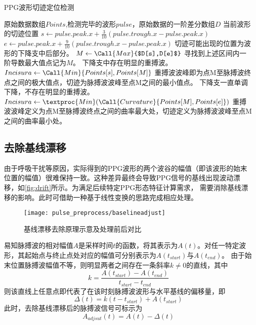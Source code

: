 \begin{breakablealgorithm}
    \caption{PPG波形切迹定位检测}
    \label{alg:incisuras_detect}
    \begin{algorithmic}[1] %
        \Require 原始数据数组$Points$,检测完毕的波形$pulse$，原始数据的一阶差分数组$D$
        \Ensure 当前波形的切迹位置
            \State $s \gets pulse.peak.x + \frac{3}{10}(pulse.trough.x-pulse.peak.x)$
            \State $e \gets pulse.peak.x + \frac{9}{10}(pulse.trough.x-pulse.peak.x)$
            \State \Comment 切迹可能出现的位置为波形的下降支中后部分。
            \State $M  \gets \Call{Max}{$D[s],D[e]$}$
            \State \Comment 寻找到上述区间内一阶导数最大值点记为$M$。
                \State \Comment 下降支中存在明显的重搏波。
                \State $Incisura \gets \Call{Min}{Points[s],Points[M]}$
                \State \Comment 重搏波波峰即为点M至脉搏波终点之间的极大值点，切迹为脉搏波波峰至点M之间的最小值点。
            \Else
                \State \Comment 下降支一直单调下降，不存在明显的重搏波。
                \State $Incisura \gets \textproc{Min}({\Call{Curvature}{Points[M],Points[e]}})$
                \State \Comment 重搏波波峰定义为点M至脉搏波终点之间的曲率最大处，切迹定义为脉搏波波峰至点M之间的曲率最小处。
            \EndIf
            \State {}
        \EndFunction
    \end{algorithmic}
\end{breakablealgorithm}

\subsection{去除基线漂移}
由于呼吸干扰等原因，实际得到的PPG波形的两个波谷的幅值（即该波形的始末位置的幅值）很难保持一致。这种差异最终会导致PPG信号的基线出现波动漂移，如\autoref{fig:drift}所示。为满足后续特定PPG形态特征计算需求，
需要消除基线漂移的影响。此时可借助一种基于线性变换的思路完成相应处理。
\begin{figure}[htbp]
    \centering
    \texttt{[image: pulse\_preprocess/baselineadjust]}
    \caption{\label{fig:drift}基线漂移去除原理示意及处理前后对比}
\end{figure}

易知脉搏波的相对幅值$A$是采样时间$t$的函数，将其表示为$A(t)$。对任一特定波形，其起始点与终止点处对应的幅值可分别表示为$A(t_{start})$与$A(t_{end})$。
由于始末位置脉搏波幅值不等，则明显两者之间存在一条斜率$k \ne 0$的直线，其中
\begin{equation}
    \label{equ:linek}
    k=\frac{A(t_{start})-A(t_{end})}{t_{start}-t_{end}}
\end{equation}
则该直线上任意点即代表了在该时刻脉搏波波形与水平基线的偏移量，即
\begin{equation}
    \label{equ:liney}
    \Delta(t)=k(t-t_{start})+A(t_{start})
\end{equation}
此时，去除基线漂移后的脉搏波信号可标示为
\begin{equation}
    \label{equ:adjusta}
    A_{adjsut}(t)=A(t)-\Delta(t)
\end{equation}

